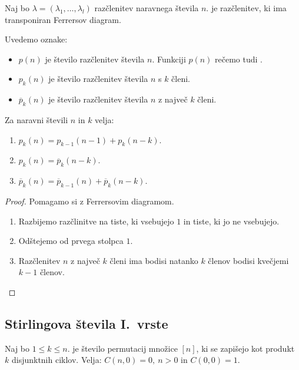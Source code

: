 \begin{definicija}
    Naj bo $\lambda = (\lambda_1, \ldots, \lambda_l)$ razčlenitev naravnega števila $n$.  je razčlenitev, ki ima transponiran Ferrersov diagram.
\end{definicija}

Uvedemo oznake:
\begin{itemize}
    \item $p(n)$ je število razčlenitev števila $n$. Funkciji $p(n)$ rečemo tudi .
    \item $p_k(n)$ je število razčlenitev števila $n$ s $k$ členi.
    \item $\overline{p}_k(n)$ je število razčlenitev števila $n$ z največ $k$ členi.
\end{itemize}

\begin{trditev}
    Za naravni števili $n$ in $k$ velja:
    \begin{enumerate}
        \item $p_k(n) = p_{k-1}(n-1) + p_k(n-k)$.
        \item $p_k(n) = \overline{p}_k(n-k)$.
        \item $\overline{p}_k(n) = \overline{p}_{k-1}(n) + \overline{p}_k(n-k)$.
    \end{enumerate}
\end{trditev}

\begin{proof}
    Pomagamo si z Ferrersovim diagramom.
    \begin{enumerate}
        \item Razbijemo razčlinitve na tiste, ki vsebujejo $1$ in tiste, ki jo ne vsebujejo.
        \item Odštejemo od prvega stolpca $1$.
        \item Razčlenitev $n$ z največ $k$ členi ima bodisi natanko $k$ členov bodisi kvečjemi $k-1$ členov. \qedhere
    \end{enumerate}
\end{proof}

\subsection{Stirlingova števila I.\ vrste}
\begin{definicija}
    Naj bo $1 \leq k \leq n$.  je število permutacij množice $[n]$, ki se zapišejo kot produkt $k$ disjunktnih ciklov.
    Velja: $C(n, 0) = 0, \ n > 0$ in $C(0,0) = 1$.
\end{definicija}


